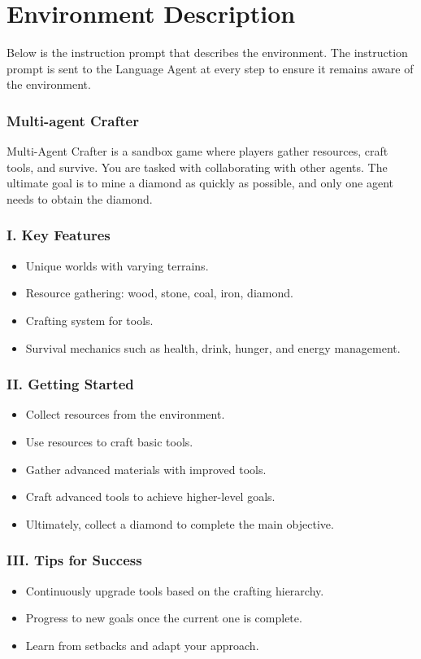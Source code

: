 \newpage
\appendix
\onecolumn
\section{Environment Description} \label{appendix:env}
Below is the instruction prompt that describes the environment. The instruction prompt is sent to the Language Agent at every step to ensure it remains aware of the environment.

\subsubsection{Multi-agent Crafter}
Multi-Agent Crafter is a sandbox game where players gather resources, craft tools, and survive. You are tasked with collaborating with other agents. The ultimate goal is to mine a diamond as quickly as possible, and only one agent needs to obtain the diamond.

\subsubsection{I. Key Features}
\begin{itemize}[label={}]
    \item Unique worlds with varying terrains.
    \item Resource gathering: wood, stone, coal, iron, diamond.
    \item Crafting system for tools.
    \item Survival mechanics such as health, drink, hunger, and energy management.
\end{itemize}

\subsubsection{II. Getting Started}
\begin{itemize}[label={}]
    \item Collect resources from the environment.
    \item Use resources to craft basic tools.
    \item Gather advanced materials with improved tools.
    \item Craft advanced tools to achieve higher-level goals.
    \item Ultimately, collect a diamond to complete the main objective.
\end{itemize}

\subsubsection{III. Tips for Success}
\begin{itemize}[label={}]
    \item Continuously upgrade tools based on the crafting hierarchy.
    \item Progress to new goals once the current one is complete.
    \item Learn from setbacks and adapt your approach.
\end{itemize}

